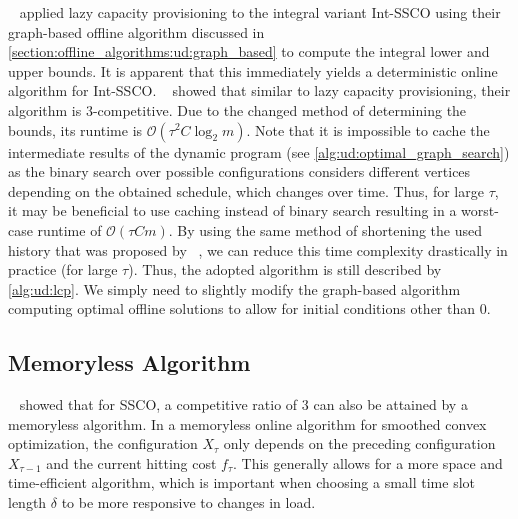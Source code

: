 \citeauthor{Albers2018}~\cite{Albers2018} applied lazy capacity provisioning to the integral variant Int-SSCO using their graph-based offline algorithm discussed in \cref{section:offline_algorithms:ud:graph_based} to compute the integral lower and upper bounds. It is apparent that this immediately yields a deterministic online algorithm for Int-SSCO. \citeauthor{Albers2018}~\cite{Albers2018} showed that similar to lazy capacity provisioning, their algorithm is $3$-competitive. Due to the changed method of determining the bounds, its runtime is $\mathcal{O}(\tau^2 C \log_2 m)$. Note that it is impossible to cache the intermediate results of the dynamic program (see \cref{alg:ud:optimal_graph_search}) as the binary search over possible configurations considers different vertices depending on the obtained schedule, which changes over time. Thus, for large $\tau$, it may be beneficial to use caching instead of binary search resulting in a worst-case runtime of $\mathcal{O}(\tau C m)$. By using the same method of shortening the used history that was proposed by \citeauthor{Lin2011}~\cite{Lin2011}, we can reduce this time complexity drastically in practice (for large $\tau$). Thus, the adopted algorithm is still described by \cref{alg:ud:lcp}. We simply need to slightly modify the graph-based algorithm computing optimal offline solutions to allow for initial conditions other than $0$.

\subsection{Memoryless Algorithm}\label{section:online_algorithms:ud:memoryless}

\citeauthor{Bansal2015}~\cite{Bansal2015} showed that for SSCO, a competitive ratio of $3$ can also be attained by a memoryless algorithm. In a memoryless online algorithm for smoothed convex optimization, the configuration $X_{\tau}$ only depends on the preceding configuration $X_{\tau-1}$ and the current hitting cost $f_{\tau}$. This generally allows for a more space and time-efficient algorithm, which is important when choosing a small time slot length $\delta$ to be more responsive to changes in load.

